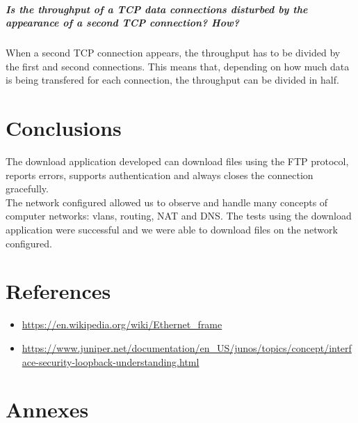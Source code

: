 \documentclass[11pt]{report}
\begin{document}
\paragraph{Is the throughput of a TCP data connections disturbed by the
appearance of a second TCP connection? How?}
When a second TCP connection appears, the throughput has to be divided by
the first and second connections. This means that, depending on how much
data is being transfered for each connection, the throughput can be divided
in half.

\chapter{Conclusions}
The download application developed can download files using the FTP protocol,
reports errors, supports authentication and always closes the connection
gracefully.\\
The network configured allowed us to observe and handle many concepts of
computer networks: vlans, routing, NAT and DNS. The tests using the download
application were successful and we were able to download files on the network
configured.

\chapter{References}
\begin{itemize}
  \item \url{https://en.wikipedia.org/wiki/Ethernet_frame}
  \item \url{https://www.juniper.net/documentation/en_US/junos/topics/concept/interface-security-loopback-understanding.html}
\end{itemize}

\chapter{Annexes}
\end{document}
